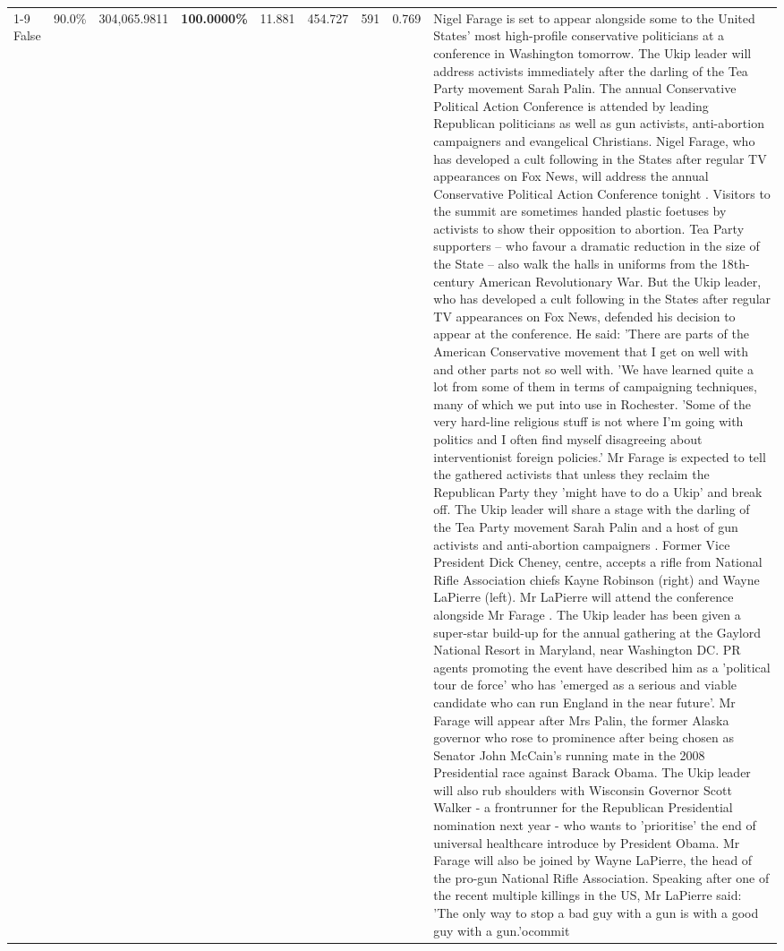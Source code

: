 \begin{table}[H]
\begin{tabular}{lllrlllll}
\cline{1-9}
False & 90.0\% & 304,065.9811 & \bfseries \color{red} 100.0000\% & 11.881 & 454.727 & 591 & 0.769 & Nigel Farage is set to appear alongside some to the United States' most high-profile conservative politicians at a conference in Washington tomorrow. The Ukip leader will address activists immediately after the darling of the Tea Party movement Sarah Palin. The annual Conservative Political Action Conference is attended by leading Republican politicians as well as gun activists, anti-abortion campaigners and evangelical Christians. Nigel Farage, who has developed a cult following in the States after regular TV appearances on Fox News, will address the annual Conservative Political Action Conference tonight . Visitors to the summit are sometimes handed plastic foetuses by activists to show their opposition to abortion. Tea Party supporters – who favour a dramatic reduction in the size of the State – also walk the halls in uniforms from the 18th-century American Revolutionary War. But the Ukip leader, who has developed a cult following in the States after regular TV appearances on Fox News, defended his decision to appear at the conference. He said: 'There are parts of the American Conservative movement that I get on well with and other parts not so well with. 'We have learned quite a lot from some of them in terms of campaigning techniques, many of which we put into use in Rochester. 'Some of the very hard-line religious stuff is not where I'm going with politics and I often find myself disagreeing about interventionist foreign policies.' Mr Farage is expected to tell the gathered activists that unless they reclaim the Republican Party they 'might have to do a Ukip' and break off. The Ukip leader will share a stage with the darling of the Tea Party movement Sarah Palin and a host of gun activists and anti-abortion campaigners . Former Vice President Dick Cheney, centre, accepts a rifle from National Rifle Association chiefs Kayne Robinson (right) and Wayne LaPierre (left). Mr LaPierre will attend the conference alongside Mr Farage . The Ukip leader has been given a super-star build-up for the annual gathering at the Gaylord National Resort in Maryland, near Washington DC. PR agents promoting the event have described him as a 'political tour de force' who has 'emerged as a serious and viable candidate who can run England in the near future'. Mr Farage will appear after Mrs Palin, the former Alaska governor who rose to prominence after being chosen as Senator John McCain's running mate in the 2008 Presidential race against Barack Obama. The Ukip leader will also rub shoulders with Wisconsin Governor Scott Walker - a frontrunner for the Republican Presidential nomination next year - who wants to 'prioritise' the end of universal healthcare introduce by President Obama. Mr Farage will also be joined by Wayne LaPierre, the head of the pro-gun National Rifle Association. Speaking after one of the recent multiple killings in the US, Mr LaPierre said: 'The only way to stop a bad guy with a gun is with a good guy with a gun.'ocommit \\

\end{tabular}
\end{table}
